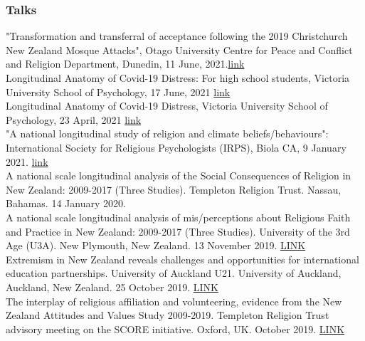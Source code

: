 \documentclass{article}
\newcommand{\years}[1]{\marginnote{\scriptsize #1}}
\begin{document}
\subsubsection*{Talks}
\years{2021$t$} "Transformation and transferral of acceptance following the 2019 Christchurch New Zealand Mosque Attacks", Otago University Centre for Peace and Conflict and Religion Department, Dunedin, 11 June, 2021.\href{https://www.dropbox.com/s/xlnd4ow5kefajoi/slides.html?dl=0}{link}\\
\years{2021$t$} Longitudinal Anatomy of Covid-19 Distress: For high school students, Victoria University School of Psychology, 17 June, 2021  \href{https://go-bayes.github.io/reports/posts/covid/student_slides.html#1}{link}\\
\years{2021$t$} Longitudinal Anatomy of Covid-19 Distress, Victoria University School of Psychology, 23 April, 2021  \href{https://go-bayes.github.io/reports/posts/covid/slides.html#1}{link}\\
\years{2021$t$}"A national longitudinal study of religion and climate beliefs/behaviours": International Society for Religious Psychologists (IRPS), Biola CA, 9 January 2021. \href{https://www.dropbox.com/s/t087jsc5inuck95/Bulbulia_Biola_Talk_EcologyReligion_Jan2021.html?dl=0}{link}\\
\years{2020$t$} A national scale longitudinal analysis of the Social Consequences of Religion in New Zealand: 2009-2017 (Three Studies). Templeton Religion Trust. Nassau, Bahamas. 14 January 2020. \\
\years{2019$^t$} A national scale longitudinal analysis of mis/perceptions about Religious Faith and Practice in New Zealand: 2009-2017 (Three Studies). University of the 3rd Age (U3A). New Plymouth, New Zealand. 13 November 2019. \href{https://www.dropbox.com/s/xypex3ektzf51cb/Bulbulia.NewPLymoth.NOV.13.2019.pptx?dl=0}{LINK}\\
\years{2019$t$} Extremism in New Zealand reveals challenges and opportunities for international education partnerships. University of Auckland U21. University of Auckland, Auckland, New Zealand. 25 October 2019. \href{https://www.dropbox.com/s/33q0ths4o9pml9l/v4.bulbulia_Auckland_u21_OCT.25.2019.low.res.pptx?dl=0}{LINK} \\
\years{2019$t$} The interplay of religious affiliation and volunteering, evidence from the New Zealand Attitudes and Values Study 2009-2019. Templeton Religion Trust advisory meeting on the SCORE initiative. Oxford, UK. October 2019. \href{https://www.dropbox.com/s/zsggoh701jvqqnv/v4.Bulbulia.TRT_Presentation.JUNE_23.2019.pptx?dl=0}{LINK}\\
\end{document}
